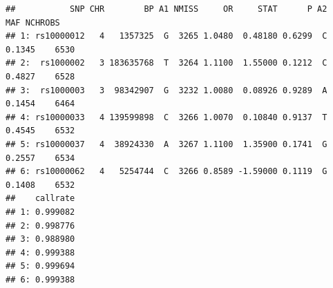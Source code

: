 \documentclass[
]{book}
\newenvironment{Shaded}{\begin{snugshade}}{\end{snugshade}}
\newcommand{\AttributeTok}[1]{\textcolor[rgb]{0.77,0.63,0.00}{#1}}
\newcommand{\ConstantTok}[1]{\textcolor[rgb]{0.00,0.00,0.00}{#1}}
\newcommand{\FunctionTok}[1]{\textcolor[rgb]{0.00,0.00,0.00}{#1}}
\newcommand{\NormalTok}[1]{#1}
\newcommand{\OtherTok}[1]{\textcolor[rgb]{0.56,0.35,0.01}{#1}}
\newcommand{\SpecialCharTok}[1]{\textcolor[rgb]{0.00,0.00,0.00}{#1}}
\newcommand{\StringTok}[1]{\textcolor[rgb]{0.31,0.60,0.02}{#1}}
\begin{document}
\begin{Shaded}
\end{Shaded}

\begin{verbatim}
##           SNP CHR        BP A1 NMISS     OR     STAT      P A2    MAF NCHROBS
## 1: rs10000012   4   1357325  G  3265 1.0480  0.48180 0.6299  C 0.1345    6530
## 2:  rs1000002   3 183635768  T  3264 1.1100  1.55000 0.1212  C 0.4827    6528
## 3:  rs1000003   3  98342907  G  3232 1.0080  0.08926 0.9289  A 0.1454    6464
## 4: rs10000033   4 139599898  C  3266 1.0070  0.10840 0.9137  T 0.4545    6532
## 5: rs10000037   4  38924330  A  3267 1.1100  1.35900 0.1741  G 0.2557    6534
## 6: rs10000062   4   5254744  C  3266 0.8589 -1.59000 0.1119  G 0.1408    6532
##    callrate
## 1: 0.999082
## 2: 0.998776
## 3: 0.988980
## 4: 0.999388
## 5: 0.999694
## 6: 0.999388
\end{verbatim}
\end{document}
